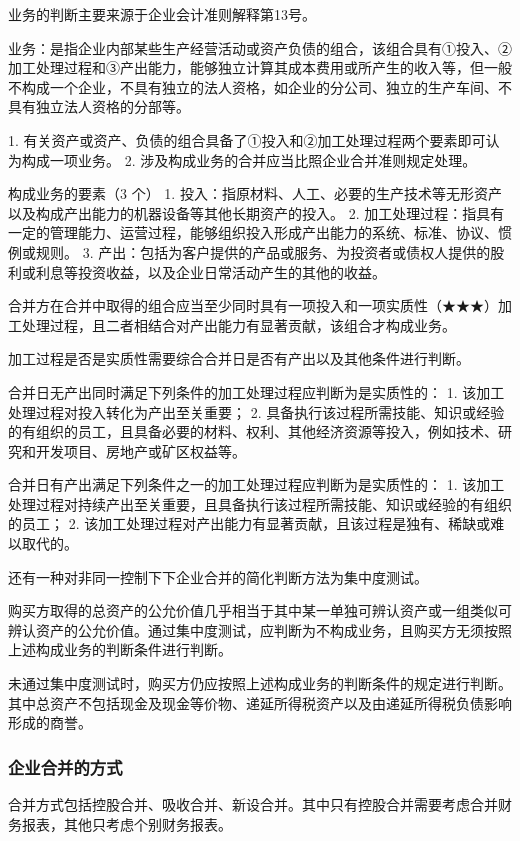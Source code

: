 \documentclass[UTF8,12pt]{ctexart}
\numberwithin{equation}{section} %
\numberwithin{figure}{section}
\numberwithin{table}{section}
\begin{document}
	业务的判断主要来源于企业会计准则解释第13号。
	
	业务：是指企业内部某些生产经营活动或资产负债的组合，该组合具有①投入、②加工处理过程和③产出能力，能够独立计算其成本费用或所产生的收入等，但一般不构成一个企业，不具有独立的法人资格，如企业的分公司、独立的生产车间、不具有独立法人资格的分部等。
	
	1.	有关资产或资产、负债的组合具备了①投入和②加工处理过程两个要素即可认为构成一项业务。
	2.	涉及构成业务的合并应当比照企业合并准则规定处理。
	
	构成业务的要素（3 个）
	1.	投入：指原材料、人工、必要的生产技术等无形资产以及构成产出能力的机器设备等其他长期资产的投入。
	2.	加工处理过程：指具有一定的管理能力、运营过程，能够组织投入形成产出能力的系统、标准、协议、惯例或规则。
	3.	产出：包括为客户提供的产品或服务、为投资者或债权人提供的股利或利息等投资收益，以及企业日常活动产生的其他的收益。
	
	合并方在合并中取得的组合应当至少同时具有一项投入和一项实质性（★★★）加工处理过程，且二者相结合对产出能力有显著贡献，该组合才构成业务。
	
	加工过程是否是实质性需要综合合并日是否有产出以及其他条件进行判断。
	
	合并日无产出同时满足下列条件的加工处理过程应判断为是实质性的：
	1.	该加工处理过程对投入转化为产出至关重要；
	2.	具备执行该过程所需技能、知识或经验的有组织的员工，且具备必要的材料、权利、其他经济资源等投入，例如技术、研究和开发项目、房地产或矿区权益等。
	
	合并日有产出满足下列条件之一的加工处理过程应判断为是实质性的：
	1.	该加工处理过程对持续产出至关重要，且具备执行该过程所需技能、知识或经验的有组织的员工；
	2.	该加工处理过程对产出能力有显著贡献，且该过程是独有、稀缺或难以取代的。
	
	还有一种对非同一控制下下企业合并的简化判断方法为集中度测试。
	
	购买方取得的总资产的公允价值几乎相当于其中某一单独可辨认资产或一组类似可辨认资产的公允价值。通过集中度测试，应判断为不构成业务，且购买方无须按照上述构成业务的判断条件进行判断。
	
	未通过集中度测试时，购买方仍应按照上述构成业务的判断条件的规定进行判断。其中总资产不包括现金及现金等价物、递延所得税资产以及由递延所得税负债影响形成的商誉。
	
	\subsubsection{企业合并的方式}
	合并方式包括控股合并、吸收合并、新设合并。其中只有控股合并需要考虑合并财务报表，其他只考虑个别财务报表。
	
\end{document}
